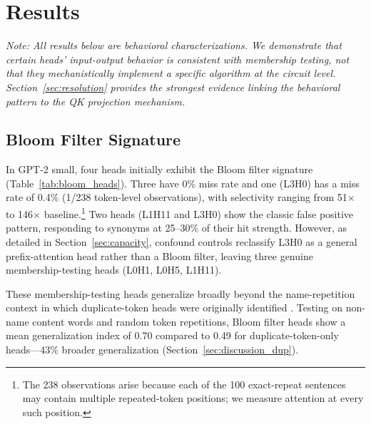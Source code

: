 \documentclass[11pt]{article}
\begin{document}
\section{Results}

\noindent\textit{Note: All results below are behavioral characterizations. We demonstrate that certain heads' input-output behavior is consistent with membership testing, not that they mechanistically implement a specific algorithm at the circuit level. Section~\ref{sec:resolution} provides the strongest evidence linking the behavioral pattern to the QK projection mechanism.}

\subsection{Bloom Filter Signature}
\label{sec:signature}

In GPT-2 small, four heads initially exhibit the Bloom filter signature (Table~\ref{tab:bloom_heads}). Three have 0\% miss rate and one (L3H0) has a miss rate of 0.4\% (1/238 token-level observations), with selectivity ranging from 51$\times$ to 146$\times$ baseline.\footnote{The 238 observations arise because each of the 100 exact-repeat sentences may contain multiple repeated-token positions; we measure attention at every such position.} Two heads (L1H11 and L3H0) show the classic false positive pattern, responding to synonyms at 25--30\% of their hit strength. However, as detailed in Section~\ref{sec:capacity}, confound controls reclassify L3H0 as a general prefix-attention head rather than a Bloom filter, leaving three genuine membership-testing heads (L0H1, L0H5, L1H11).

These membership-testing heads generalize broadly beyond the name-repetition context in which duplicate-token heads were originally identified \citep{wang2022interpretability}. Testing on non-name content words and random token repetitions, Bloom filter heads show a mean generalization index of 0.70 compared to 0.49 for duplicate-token-only heads---43\% broader generalization (Section~\ref{sec:discussion_dup}).
\end{document}
